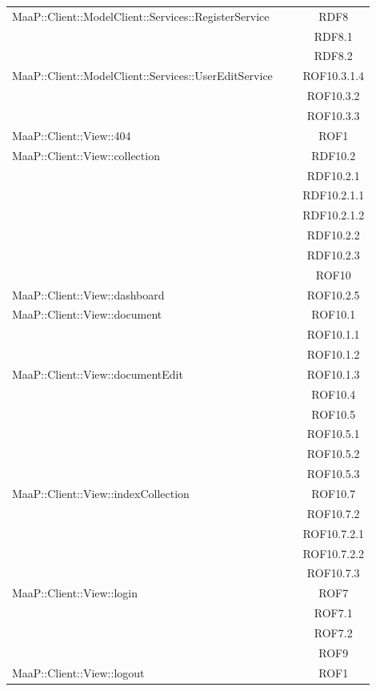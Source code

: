 \begin{center}
\begin{longtable}{|p{0.8\linewidth}|c|}
\midrule
MaaP::Client::ModelClient::Services::RegisterService
& RDF8\\
& RDF8.1\\
& RDF8.2\\

\midrule
MaaP::Client::ModelClient::Services::UserEditService
& ROF10.3.1.4\\
& ROF10.3.2\\
& ROF10.3.3\\

\midrule
MaaP::Client::View::404
& ROF1\\

\midrule
MaaP::Client::View::collection
& RDF10.2\\
& RDF10.2.1\\
& RDF10.2.1.1\\
& RDF10.2.1.2\\
& RDF10.2.2\\
& RDF10.2.3\\
& ROF10\\

\midrule
MaaP::Client::View::dashboard
& ROF10.2.5\\

\midrule
MaaP::Client::View::document
& ROF10.1\\
& ROF10.1.1\\
& ROF10.1.2\\

\midrule
MaaP::Client::View::documentEdit
& ROF10.1.3\\
& ROF10.4\\
& ROF10.5\\
& ROF10.5.1\\
& ROF10.5.2\\
& ROF10.5.3\\

\midrule
MaaP::Client::View::indexCollection
& ROF10.7\\
& ROF10.7.2\\
& ROF10.7.2.1\\
& ROF10.7.2.2\\
& ROF10.7.3\\

\midrule
MaaP::Client::View::login
& ROF7\\
& ROF7.1\\
& ROF7.2\\
& ROF9\\

\midrule
MaaP::Client::View::logout
& ROF1\\


\end{longtable}
\end{center}
